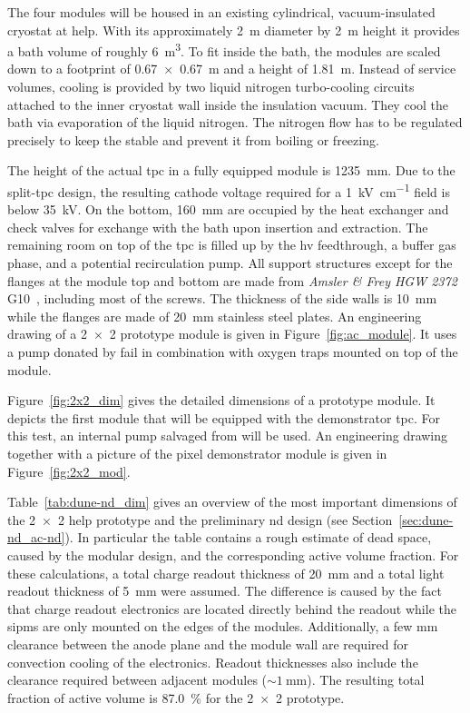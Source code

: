 The four modules will be housed in an existing cylindrical, vacuum-insulated cryostat at \gls{help}.
With its approximately \SI{2}{\metre} diameter by \SI{2}{\metre} height it provides a \lar{} bath volume of roughly \SI{6}{\metre\cubed}.
To fit inside the bath, the modules are scaled down to a footprint of \SI{0.67 x 0.67}{\metre} and a height of \SI{1.81}{\metre}.
Instead of service volumes, cooling is provided by two liquid nitrogen turbo-cooling circuits attached to the inner cryostat wall inside the insulation vacuum.
They cool the \lar{} bath via evaporation of the liquid nitrogen.
The nitrogen flow has to be regulated precisely to keep the \lar{} stable and prevent it from boiling or freezing.

The height of the actual \gls{tpc} in a fully equipped module is \SI{1235}{\milli\metre}.
Due to the split-\gls{tpc} design, the resulting cathode voltage required for a \SI{1}{\kilo\volt\per\centi\metre} field is below \SI{35}{\kilo\volt}.
On the bottom, \SI{160}{\milli\metre} are occupied by the heat exchanger and check valves for \lar{} exchange with the bath upon insertion and extraction.
The remaining room on top of the \gls{tpc} is filled up by the \gls{hv} feedthrough, a buffer gas phase, and a potential recirculation pump.
All support structures except for the flanges at the module top and bottom are made from \emph{Amsler \& Frey HGW 2372} G10~\cite{g10}, including most of the screws.
The thickness of the side walls is \SI{10}{\milli\metre} while the flanges are made of \SI{20}{\milli\metre} stainless steel plates.
An engineering drawing of a \num{2 x 2} prototype module is given in Figure~\ref{fig:ac_module}.
It uses a \lar{} pump donated by \gls{fail} in combination with oxygen traps mounted on top of the module.

Figure~\ref{fig:2x2_dim} gives the detailed dimensions of a prototype module.
It depicts the first module that will be equipped with the demonstrator \gls{tpc}.
For this test, an internal pump salvaged from \AT{} will be used.
An engineering drawing together with a picture of the pixel demonstrator module is given in Figure~\ref{fig:2x2_mod}.

Table~\ref{tab:dune-nd_dim} gives an overview of the most important dimensions of the \num{2 x 2} \gls{help} prototype and the preliminary \gls{nd} design (see Section~\ref{sec:dune-nd_ac-nd}).
In particular the table contains a rough estimate of dead space, caused by the modular design, and the corresponding active volume fraction.
For these calculations, a total charge readout thickness of \SI{20}{\milli\metre} and a total light readout thickness of \SI{5}{\milli\metre} were assumed.
The difference is caused by the fact that charge readout electronics are located directly behind the readout while the \glspl{sipm} are only mounted on the edges of the \AL{} modules.
Additionally, a few \si{\milli\metre} clearance between the anode plane and the module wall are required for convection cooling of the \larpix{} electronics.
Readout thicknesses also include the clearance required between adjacent modules ($\sim{\SI{1}{\milli\metre}}$).
The resulting total fraction of active volume is \SI{87.0}{\percent} for the \num{2 x 2} prototype.

